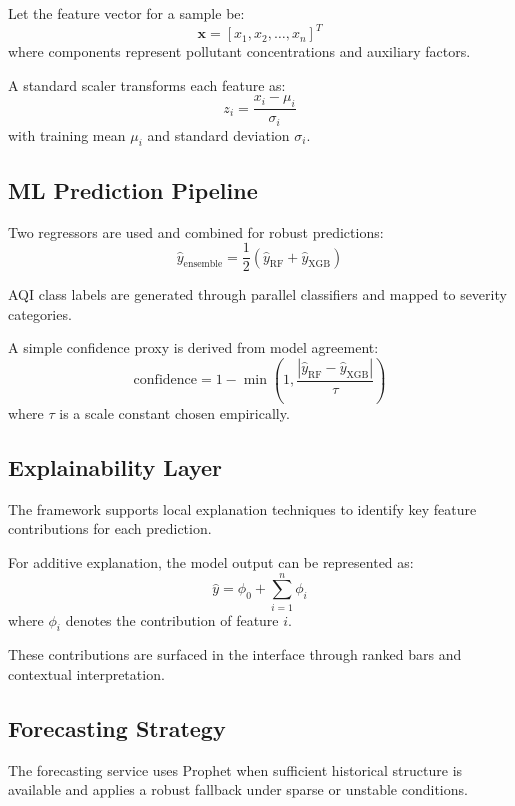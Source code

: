 \documentclass[12pt,a4paper]{article}
\begin{document}
Let the feature vector for a sample be:
\begin{equation}
\mathbf{x} = [x_1, x_2, \dots, x_n]^T
\end{equation}
where components represent pollutant concentrations and auxiliary factors.

A standard scaler transforms each feature as:
\begin{equation}
z_i = \frac{x_i - \mu_i}{\sigma_i}
\end{equation}
with training mean $\mu_i$ and standard deviation $\sigma_i$.

\subsection{ML Prediction Pipeline}
Two regressors are used and combined for robust predictions:
\begin{equation}
\hat{y}_{\text{ensemble}} = \frac{1}{2}\left(\hat{y}_{\text{RF}} + \hat{y}_{\text{XGB}}\right)
\end{equation}

AQI class labels are generated through parallel classifiers and mapped to severity categories.

A simple confidence proxy is derived from model agreement:
\begin{equation}
\text{confidence} = 1 - \min\left(1, \frac{|\hat{y}_{\text{RF}} - \hat{y}_{\text{XGB}}|}{\tau}\right)
\end{equation}
where $\tau$ is a scale constant chosen empirically.

\subsection{Explainability Layer}
The framework supports local explanation techniques to identify key feature contributions for each prediction.

For additive explanation, the model output can be represented as:
\begin{equation}
\hat{y} = \phi_0 + \sum_{i=1}^{n} \phi_i
\end{equation}
where $\phi_i$ denotes the contribution of feature $i$.

These contributions are surfaced in the interface through ranked bars and contextual interpretation.

\subsection{Forecasting Strategy}
The forecasting service uses Prophet when sufficient historical structure is available and applies a robust fallback under sparse or unstable conditions.
\end{document}
